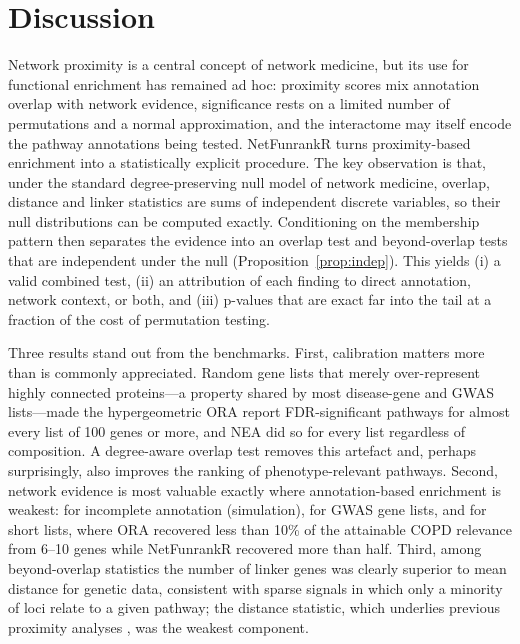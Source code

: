 \section{Discussion}
Network proximity is a central concept of network medicine, but its use for functional enrichment has remained ad hoc: proximity scores mix annotation overlap with network evidence, significance rests on a limited number of permutations and a normal approximation, and the interactome may itself encode the pathway annotations being tested. NetFunrankR turns proximity-based enrichment into a statistically explicit procedure. The key observation is that, under the standard degree-preserving null model of network medicine, overlap, distance and linker statistics are sums of independent discrete variables, so their null distributions can be computed exactly. Conditioning on the membership pattern then separates the evidence into an overlap test and beyond-overlap tests that are independent under the null (Proposition~\ref{prop:indep}). This yields (i) a valid combined test, (ii) an attribution of each finding to direct annotation, network context, or both, and (iii) p-values that are exact far into the tail at a fraction of the cost of permutation testing.

Three results stand out from the benchmarks. First, calibration matters more than is commonly appreciated. Random gene lists that merely over-represent highly connected proteins---a property shared by most disease-gene and GWAS lists---made the hypergeometric ORA report FDR-significant pathways for almost every list of 100 genes or more, and NEA did so for every list regardless of composition. A degree-aware overlap test removes this artefact and, perhaps surprisingly, also improves the ranking of phenotype-relevant pathways. Second, network evidence is most valuable exactly where annotation-based enrichment is weakest: for incomplete annotation (simulation), for GWAS gene lists, and for short lists, where ORA recovered less than 10\% of the attainable COPD relevance from 6--10 genes while NetFunrankR recovered more than half. Third, among beyond-overlap statistics the number of linker genes was clearly superior to mean distance for genetic data, consistent with sparse signals in which only a minority of loci relate to a given pathway; the distance statistic, which underlies previous proximity analyses \citep{Menche2015,Guney2016}, was the weakest component.

